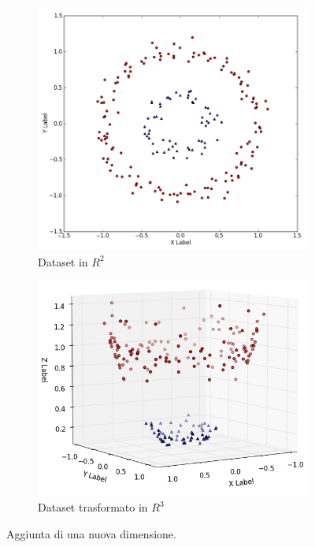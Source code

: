 \documentclass[oneside]{book}
\begin{document}
\begin{figure}[!h]
	\begin{subfigure}[b]{0.5\textwidth}
		\includegraphics[width=\linewidth]{assets/svm-non-separable-1.png}
		\caption{Dataset in $R^2$}
		\label{fig:dataset-r2}
	\end{subfigure}
	\hfill
	\begin{subfigure}[b]{0.5\textwidth}
		\includegraphics[width=\linewidth]{assets/svm-non-separable-2.png}
		\caption{Dataset trasformato in $R^3$}
		\label{fig:dataset-r3}
	\end{subfigure}%
	\caption[Caption for LOF]{Aggiunta di una nuova dimensione.\footnotemark}
\end{figure}
\end{document}

